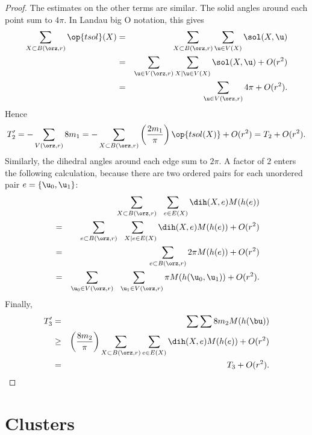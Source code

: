\begin{proof}
The estimates on the other terms are similar.  The solid angles
around each point sum to $4\pi$.
In Landau big O notation, this gives
\begin{eqnarray*}
\sum_{X\subset B(\orz,r)} \op{tsol}(X) &=& 
\sum_{X\subset B(\orz,r)} \sum_{ \u\in V(X)} \sol(X, \u)\\
&=&\sum_{ \u\in  V(\orz,r)} \sum_{X\mid  \u\in V(X)} \sol(X, \u) + O(r^2)\\
&=&\sum_{ \u\in  V(\orz,r)} 4\pi    + O(r^2).
\end{eqnarray*}
Hence
\begin{displaymath}
T_2' = -\sum_{ V(\orz,r)} 8 m_1 = 
-\sum_{X\subset B(\orz,r)}\left(\frac{2m_1}\pi\right) \op{tsol(X)} + O(r^2) = T_2 + O(r^2).
\end{displaymath}
Similarly, the dihedral angles around each edge sum to $2\pi$.  A
factor of $2$ enters the following calculation, because there are two
ordered pairs for each unordered pair $e=\{ \u_0, \u_1\}$:
\begin{eqnarray*}
&\phantom{=}&\sum_{X\subset B(\orz,r)} \sum_{~~e\in E(X)} \dih(X,e)  M(h(e)) \vspace{3pt}\\
&=&\sum_{e\subset B(\orz,r)} \sum_{~~X\mid e\in E(X)} \dih(X,e)  M(h(e)) +O(r^2)\vspace{3pt}\\
&=&\sum_{e\subset B(\orz,r)} 2\pi M(h(e)) + O(r^2)\vspace{3pt} \\
&=&\sum_{ \u_0\in  V(\orz,r)} \sum_{~~\u_1\in  V(\orz,r) } \pi M(h( \u_0, \u_1)) + O(r^2).\\
\end{eqnarray*}
Finally,
\begin{eqnarray*}
T_3' &=& \sum\sum 8 m_2 M(h(\bu)) \\
&\ge& \left(\frac{8m_2}\pi\right)
\sum_{X\subset B(\orz,r)}\sum_{e\in E(X)}\dih(X,e) M(h(e)) + O(r^2) \\
&=& T_3 + O(r^2).
\end{eqnarray*}
\end{proof}




\section{Clusters}

